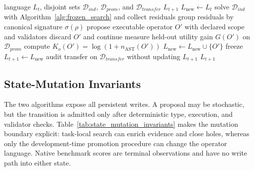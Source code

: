 \documentclass[letterpaper]{article}
\begin{document}
\begin{algorithm}[H]
\caption{Residual-conditioned language growth on development tasks}
\label{alg:language_growth}
\begin{algorithmic}[1]
\REQUIRE language $L_t$, disjoint sets $\mathcal{D}_{ind}$,
$\mathcal{D}_{prom}$, and $\mathcal{D}_{transfer}$
\ENSURE $L_{t+1}$
\STATE $L_{\mathrm{new}}\leftarrow L_t$
\STATE solve $\mathcal{D}_{ind}$ with Algorithm~\ref{alg:frozen_search} and collect residuals
\STATE group residuals by canonical signature $\sigma(\rho)$
  \STATE propose executable operator $O'$ with declared scope and validators
    \STATE discard $O'$ and continue
  \ENDIF
  \STATE measure held-out utility gain $G(O')$ on $\mathcal{D}_{prom}$
  \STATE compute $K_o(O')=\log(1+n_{\mathrm{AST}}(O'))$
    \STATE $L_{\mathrm{new}}\leftarrow L_{\mathrm{new}}\cup\{O'\}$
  \ENDIF
\ENDFOR
\STATE freeze $L_{t+1}\leftarrow L_{\mathrm{new}}$
\STATE audit transfer on $\mathcal{D}_{transfer}$ without updating $L_{t+1}$
\RETURN $L_{t+1}$
\end{algorithmic}
\end{algorithm}

\subsection*{State-Mutation Invariants}

The two algorithms expose all persistent writes. A proposal may be stochastic,
but the transition is admitted only after deterministic type, execution, and
validator checks. Table~\ref{tab:state_mutation_invariants} makes the mutation
boundary explicit: task-local search can enrich evidence and close holes,
whereas only the development-time promotion procedure can change the operator
language. Native benchmark scores are terminal observations and have no write
path into either state.
\end{document}
